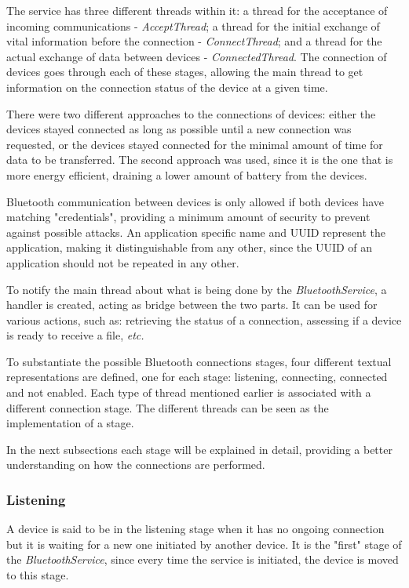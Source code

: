 The service has three different threads within it: a thread for the acceptance of incoming communications - \textit{AcceptThread}; a thread for the initial exchange of vital information before the connection - \textit{ConnectThread}; and a thread for the actual exchange of data between devices - \textit{ConnectedThread}. The connection of devices goes through each of these stages, allowing the main thread to get information on the connection status of the device at a given time.

There were two different approaches to the connections of devices: either the devices stayed connected as long as possible until a new connection was requested, or the devices stayed connected for the minimal amount of time for data to be transferred. The second approach was used, since it is the one that is more energy efficient, draining a lower amount of battery from the devices.

Bluetooth communication between devices is only allowed if both devices have matching "credentials", providing a minimum amount of security to prevent against possible attacks. An application specific name and \gls{UUID} represent the application, making it distinguishable from any other, since the \gls{UUID} of an application should not be repeated in any other.

To notify the main thread about what is being done by the \textit{BluetoothService}, a handler is created, acting as bridge between the two parts. It can be used for various actions, such as: retrieving the status of a connection, assessing if a device is ready to receive a file, \textit{etc.}

To substantiate the possible Bluetooth connections stages, four different textual representations are defined, one for each stage: listening, connecting, connected and not enabled. Each type of thread mentioned earlier is associated with a different connection stage. The different threads can be seen as the implementation of a stage.

In the next subsections each stage will be explained in detail, providing a better understanding on how the connections are performed.

\subsubsection{Listening}
\label{subsubsec:listening}

A device is said to be in the listening stage when it has no ongoing connection but it is waiting for a new one initiated by another device. It is the "first" stage of the \textit{BluetoothService}, since every time the service is initiated, the device is moved to this stage.

